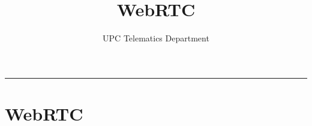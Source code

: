 \documentclass[english,11pt]{book}
\author{UPC Telematics Department}
\title{WebRTC}
\date{}
\makeatletter
\def\thickhrulefill{\leavevmode \leaders \hrule height 1pt\hfill \kern \z@}
\def\maketitle{%
  \null
  \thispagestyle{empty}%
  {\large \raggedleft \@textoA\par}
  \vfill
  \begin{center}\leavevmode
    \normalfont
    {\LARGE\raggedleft \@author\par}%
    \thickhrulefill\par
    {\huge\raggedright \@title\par}%
    \vskip 1cm
  \end{center}%
  \vfill
  {\large \@textoB\par}
  \null

\clearpage
  }
\newif\ifSOLS
\makeatother
\begin{document}
\maketitle
\pagestyle{empty}

%

\setcounter{tocdepth}{2}
\tableofcontents

\pagestyle{plain}
\chapter{WebRTC\label{chap:webRTC}}

% 

\ifSOLS
\newpage
\section{Answers to practices}
\shipoutExercise
\vspace{0.5cm}
\shipoutAnswer
\fi


% 
%

\end{document}
